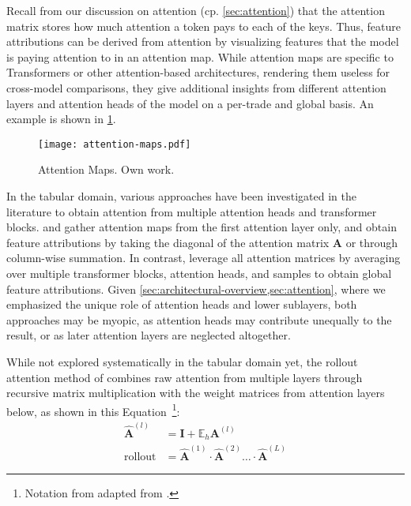 Recall from our discussion on attention (cp. \cref{sec:attention}) that the attention matrix stores how much attention a token pays to each of the keys. Thus, feature attributions can be derived from attention by visualizing features that the model is paying attention to in an attention map. While attention maps are specific to Transformers or other attention-based architectures, rendering them useless for cross-model comparisons, they give additional insights from different attention layers and attention heads of the model on a per-trade and global basis. An example is shown in \cref{fig:attention-maps}.

\begin{figure}[ht]
    \centering
    \texttt{[image: attention-maps.pdf]}
    \caption[Attention Maps]{Attention Maps. Own work.}
    \label{fig:attention-maps}
\end{figure}

In the tabular domain, various approaches have been investigated in the literature to obtain attention from multiple attention heads and transformer blocks. \textcite[][18]{somepalliSAINTImprovedNeural2021} and \textcite[][11]{borisovDeepNeuralNetworks2022} gather attention maps from the first attention layer only, and \textcite[][11]{borisovDeepNeuralNetworks2022} obtain feature attributions by taking the diagonal of the attention matrix $\mathbf{A}$ or through column-wise summation. In contrast, \textcite[][10]{gorishniyRevisitingDeepLearning2021} leverage all attention matrices by averaging over multiple transformer blocks, attention heads, and samples to obtain global feature attributions. Given \cref{sec:architectural-overview,sec:attention}, where we emphasized the unique role of attention heads and lower sublayers, both approaches may be myopic, as attention heads may contribute unequally to the result, or as later attention layers are neglected altogether.

While not explored systematically in the tabular domain yet, the rollout attention method of \textcite[][3]{abnarQuantifyingAttentionFlow2020} combines raw attention from multiple layers through recursive matrix multiplication with the weight matrices from attention layers below, as shown in this Equation~\footnote{Notation from adapted from \textcite[][786]{cheferTransformerInterpretabilityAttention2021}.}:
\begin{equation}
    \begin{aligned}
        \hat{\mathbf{A}}^{(l)}    & =\mathbf{I}+\mathbb{E}_h \mathbf{A}^{(l)}                                              \\
        \operatorname { rollout } & =\hat{\mathbf{A}}^{(1)} \cdot \hat{\mathbf{A}}^{(2)} \ldots\cdot\hat{\mathbf{A}}^{(L)}
    \end{aligned}
    \label{eq:attention-map-rollout}
\end{equation}

